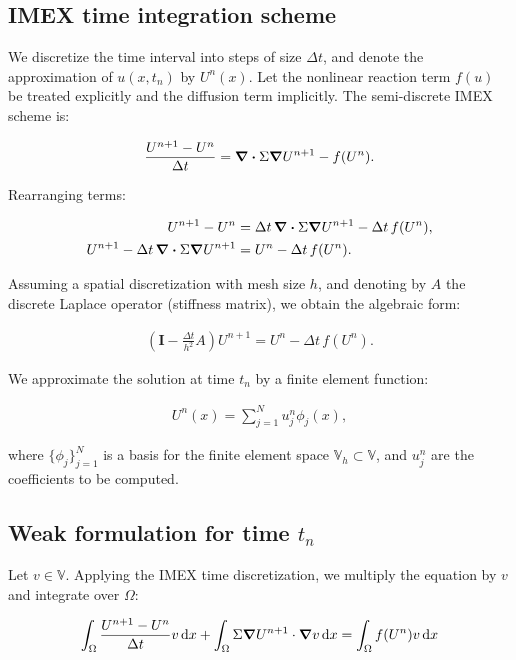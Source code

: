 \documentclass[unicode,11pt,a4paper,oneside,numbers=endperiod,openany]{article}
\begin{document}
\subsection{IMEX time integration scheme}

We discretize the time interval into steps of size $\Delta t$, and
denote the approximation of $u(x, t_n)$ by $U^n(x)$. Let the
nonlinear reaction term $f(u)$ be treated explicitly and the
diffusion term implicitly. The semi-discrete IMEX scheme is:

\begin{align*}
	\frac{U^{n+1} - U^n}{\Delta t} = \divergence \Sigma \grad U^{n+1} - f(U^n).
\end{align*}

Rearranging terms:

\begin{align*}
	U^{n+1} - U^n                                         & = \Delta t\, \divergence \Sigma \grad U^{n+1} - \Delta t\, f(U^n), \\
	U^{n+1} - \Delta t\, \divergence \Sigma \grad U^{n+1} & = U^n - \Delta t\, f(U^n).
\end{align*}

Assuming a spatial discretization with mesh size $h$, and denoting
by $A$ the discrete Laplace operator (stiffness matrix), we
obtain the algebraic form:

\begin{align*}
	(\mathbf I - \frac{\Delta t}{h^2} A) U^{n+1} = U^n - \Delta t\, f(U^n).
\end{align*}

We approximate the solution at time $t_n$ by a finite element function:

\begin{align*}
	U^n(x) = \sum_{j=1}^{N} u_j^n \phi_j(x),
\end{align*}

where $\{\phi_j\}_{j=1}^N$ is a basis for the finite element space
$\mathbb{V}_h \subset \mathbb{V}$, and $u_j^n$ are the
coefficients to be computed.


\subsection{Weak formulation for time $t_n$}

Let $v \in \mathbb{V}$. Applying the IMEX time discretization, we multiply the equation by
$v$ and integrate over $\Omega$:

\begin{align*}
	\int_\Omega \frac{U^{n+1} - U^n}{\Delta t} v\,\diffd x +
	\int_\Omega \Sigma \grad U^{n+1} \cdot \grad v\,\diffd x =
	\int_\Omega f(U^n) v\,\diffd x
\end{align*}
\end{document}
